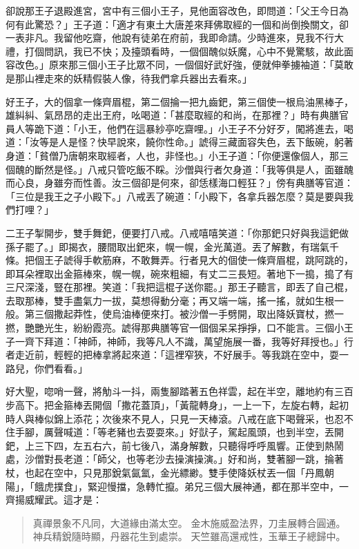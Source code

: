 卻說那王子退殿進宮，宮中有三個小王子，見他面容改色，即問道：「父王今日為何有此驚恐？」王子道：「適才有東土大唐差來拜佛取經的一個和尚倒換關文，卻一表非凡。我留他吃齋，他說有徒弟在府前，我即命請。少時進來，見我不行大禮，打個問訊，我已不快；及擡頭看時，一個個醜似妖魔，心中不覺驚駭，故此面容改色。」原來那三個小王子比眾不同，一個個好武好強，便就伸拳擄袖道：「莫敢是那山裡走來的妖精假裝人像，待我們拿兵器出去看來。」

好王子，大的個拿一條齊眉棍，第二個掄一把九齒鈀，第三個使一根烏油黑棒子，雄糾糾、氣昂昂的走出王府，吆喝道：「甚麼取經的和尚，在那裡？」時有典膳官員人等跪下道：「小王，他們在這暴紗亭吃齋哩。」小王子不分好歹，闖將進去，喝道：「汝等是人是怪？快早說來，饒你性命。」諕得三藏面容失色，丟下飯碗，躬著身道：「貧僧乃唐朝來取經者，人也，非怪也。」小王子道：「你便還像個人，那三個醜的斷然是怪。」八戒只管吃飯不睬。沙僧與行者欠身道：「我等俱是人，面雖醜而心良，身雖夯而性善。汝三個卻是何來，卻恁樣海口輕狂？」傍有典膳等官道：「三位是我王之子小殿下。」八戒丟了碗道：「小殿下，各拿兵器怎麼？莫是要與我們打哩？」

二王子掣開步，雙手舞鈀，便要打八戒。八戒嘻嘻笑道：「你那鈀只好與我這鈀做孫子罷了。」即揭衣，腰間取出鈀來，幌一幌，金光萬道。丟了解數，有瑞氣千條。把個王子諕得手軟筋麻，不敢舞弄。行者見大的個使一條齊眉棍，跳阿跳的，即耳朵裡取出金箍棒來，幌一幌，碗來粗細，有丈二三長短。著地下一搗，搗了有三尺深淺，豎在那裡。笑道：「我把這棍子送你罷。」那王子聽言，即丟了自己棍，去取那棒，雙手盡氣力一拔，莫想得動分毫；再又端一端，搖一搖，就如生根一般。第三個撒起莽性，使烏油棒便來打。被沙僧一手劈開，取出降妖寶杖，撚一撚，艷艷光生，紛紛霞亮。諕得那典膳等官一個個呆呆掙掙，口不能言。三個小王子一齊下拜道：「神師，神師，我等凡人不識，萬望施展一番，我等好拜授也。」行者走近前，輕輕的把棒拿將起來道：「這裡窄狹，不好展手。等我跳在空中，耍一路兒，你們看看。」

好大聖，唿哨一聲，將觔斗一抖，兩隻腳踏著五色祥雲，起在半空，離地約有三百步高下。把金箍棒丟開個「撒花蓋頂」，「黃龍轉身」，一上一下，左旋右轉，起初時人與棒似錦上添花；次後來不見人，只見一天棒滾。八戒在底下喝聲采，也忍不住手腳，厲聲喊道：「等老豬也去耍耍來。」好獃子，駕起風頭，也到半空，丟開鈀，上三下四，左五右六，前七後八，滿身解數，只聽得呼呼風響。正使到熱鬧處，沙僧對長老道：「師父，也等老沙去操演操演。」好和尚，雙著腳一跳，掄著杖，也起在空中，只見那銳氣氤氳，金光縹緲。雙手使降妖杖丟一個「丹鳳朝陽」，「餓虎撲食」，緊迎慢擋，急轉忙攛。弟兄三個大展神通，都在那半空中，一齊揚威耀武。這才是：
\begin{quote}
真禪景象不凡同，大道緣由滿太空。
金木施威盈法界，刀圭展轉合圓通。
神兵精銳隨時顯，丹器花生到處崇。
天竺雖高還戒性，玉華王子總歸中。
\end{quote}

